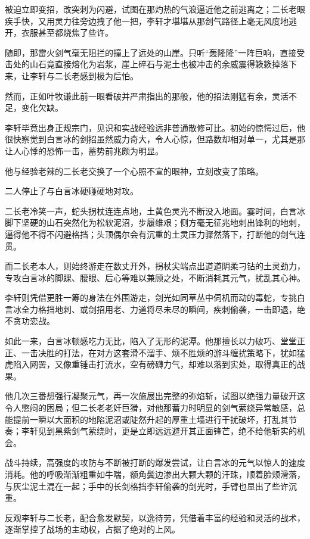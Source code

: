 被迫立即变招，改突刺为闪避，试图在那灼热的气浪逼近他之前逃离之；二长老眼疾手快，又用灵力往旁边拽了他一把，李轩才堪堪从那剑气路径上毫无风度地逃开，衣服甚至都烧焦了些许。

随即，那雷火剑气毫无阻拦的撞上了远处的山崖。只听“轰隆隆”一阵巨响，直接受击处的山石竟直接熔化为岩浆，崖上碎石与泥土也被冲击的余威震得簌簌掉落下来，让李轩与二长老感到极为后怕。

然而，正如叶牧谦此前一眼看破并严肃指出的那般，他的招法刚猛有余，灵活不足，变化欠缺。

李轩毕竟出身正规宗门，见识和实战经验远非普通散修可比。初始的惊愕过后，他很快察觉到白言冰的剑招虽然威力奇大，令人心惊，但路数却相对单一，尤其是那让人心悸的恐怖一击，蓄势前兆颇为明显。

他与经验老辣的二长老交换了一个心照不宣的眼神，立刻改变了策略。

二人停止了与白言冰硬碰硬地对攻。

二长老冷笑一声，蛇头拐杖连连点地，土黄色灵光不断没入地面。霎时间，白言冰脚下坚硬的山石突然化为松软泥沼，步履维艰；侧方毫无征兆地刺出锋利的地刺，逼得他不得不闪避格挡；头顶偶尔会有沉重的土灵压力骤然落下，打断他的剑气连贯。

而二长老本人，则始终游走在数丈开外，拐杖尖端点出道道阴柔刁钻的土灵劲力，专攻白言冰的脚踝、腰眼、后心等难以兼顾之处，不断消耗其元气，扰乱其心神。

李轩则凭借更胜一筹的身法在外围游走，剑光如同草丛中伺机而动的毒蛇，专挑白言冰全力格挡地刺、或剑招用老、力道将尽未尽的瞬间，疾刺偷袭，一击即退，绝不贪功恋战。

如此一来，白言冰顿感吃力无比，陷入了无形的泥潭。他那擅长以力破巧、堂堂正正、一击决胜的打法，在对方这套滑不溜手、烦不胜烦的游斗缠扰策略下，犹如猛虎陷入网罟，又像重锤击打流水，空有磅礴力气，却难以落到实处，取得真正的战果。

他几次三番想强行凝聚元气，再一次施展出完整的弥焰斩，试图以绝强力量破开这令人憋闷的困局；但二长老老奸巨猾，对他那蓄力时明显的剑气萦绕异常敏感，总能提前一瞬以大面积的地陷泥沼或陡然升起的厚重土墙进行干扰破坏，打乱其节奏；李轩见到黑紫剑气萦绕时，更是立即远远避开其正面锋芒，绝不给他斩实的机会。

战斗持续，高强度的攻防与不断被打断的爆发尝试，让白言冰的元气以惊人的速度消耗。他的呼吸渐渐粗重如牛喘，额角鬓边渗出大颗大颗的汗珠，顺着脸颊滑落，与灰尘泥土混在一起；手中的长剑格挡李轩偷袭的剑光时，手臂也显出了些许沉重。

反观李轩与二长老，配合愈发默契，以逸待劳，凭借着丰富的经验和灵活的战术，逐渐掌控了战场的主动权，占据了绝对的上风。


